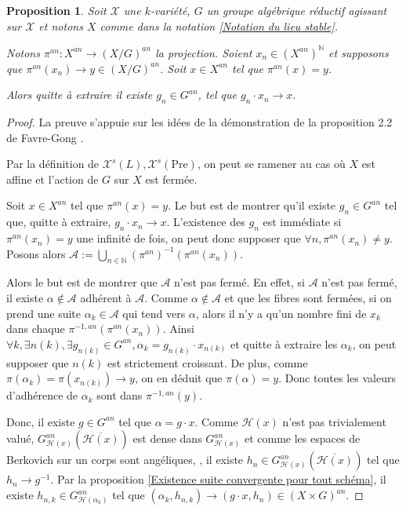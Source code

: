 \documentclass[11pt]{article}
\newcommand{\N}{\mathbb{N}}
\newcommand{\Pre}{\mathrm{Pre}}
\newtheorem{prop}[thm]{Proposition}
\begin{document}
\begin{prop}\label{existence convergence fibre si convergence dans le quotient}
Soit $\mathcal{X}$ une $k$-variété, $G$ un groupe algébrique réductif agissant sur $\mathcal{X}$ et notons $X$ comme dans la notation \ref{Notation du lieu stable}.

Notons $\pi^{an} : X^{an} \rightarrow (X/G)^{an}$ la projection. Soient $x_n \in (X^{an})^\N$ et supposons que $\pi^{an}(x_n) \rightarrow y \in (X/G)^{an}$. Soit $x \in X^{an}$ tel que $\pi^{an}(x) = y$. 

Alors quitte à extraire il existe $g_n \in G^{an}$, tel que $g_n\cdot x_n \rightarrow x.$ 
\end{prop}
\begin{proof}
La preuve s'appuie sur les idées de la démonstration de la proposition 2.2 de Favre-Gong \cite{FavreGong}.

Par la définition de $\mathcal{X}^s(L), \mathcal{X}^s(\Pre)$, on peut se ramener au cas où $X$ est affine et l'action de $G$ sur $X$ est fermée.

Soit $x \in X^{an}$ tel que $\pi^{an}(x) = y$. Le but est de montrer qu'il existe $g_n \in G^{an}$ tel que, quitte à extraire, $g_n \cdot x_n \rightarrow x$. L'existence des $g_n$ est immédiate si $\pi^{an}(x_n) = y$ une infinité de fois, on peut donc supposer que $\forall n, \pi^{an}(x_n) \neq y$. Posons alors $\mathcal{A} := \bigcup_{n\in \N} (\pi^{an})^{-1}(\pi^{an}(x_n))$.

Alors le but est de montrer que $\mathcal{A}$ n'est pas fermé. En effet, si $\mathcal{A}$ n'est pas fermé, il existe $\alpha \notin \mathcal{A}$ adhérent à $\mathcal{A}$. Comme $\alpha\notin \mathcal{A}$ et que les fibres sont fermées, si on prend une suite $\alpha_k \in \mathcal{A}$ qui tend vers $\alpha$, alors il n'y a qu'un nombre fini de $x_k$ dans chaque $\pi^{-1,an}(\pi^{an}(x_n))$. Ainsi $\forall k, \exists n(k), \exists g_{n(k)} \in G^{an}, \alpha_k = g_{n(k)}\cdot x_{n(k)}$ et quitte à extraire les $\alpha_k$, on peut supposer que $n(k)$ est strictement croissant. De plus, comme $\pi(\alpha_k) = \pi(x_{n(k)}) \rightarrow y$, on en déduit que $\pi(\alpha) = y$. Donc toutes les valeurs d'adhérence de $\alpha_k$ sont dans $\pi^{-1,an}(y)$. 

Donc, il existe $g\in G^{an}$ tel que $\alpha = g\cdot x$. Comme $\mathcal{H}(x)$ n'est pas trivialement valué, $G^{an}_{\mathcal{H}(x)}(\overline{\mathcal{H}(x)})$ est dense dans $G^{an}_{\mathcal{H}(x)}$ et comme les espaces de Berkovich sur un corps sont angéliques, \cite{PoineauAngelique}, il existe $h_n \in G^{an}_{\mathcal{H}(x)}(\overline{\mathcal{H}(x)})$ tel que $h_n \rightarrow g^{-1}$. Par la proposition \ref{Existence suite convergente pour tout schéma}, il existe $h_{n,k} \in G^{an}_{\mathcal{H}(\alpha_k)}$ tel que $(\alpha_k, h_{n,k}) \rightarrow (g \cdot x, h_n) \in (X\times G)^{an}$. 


\end{proof}
\end{document}

